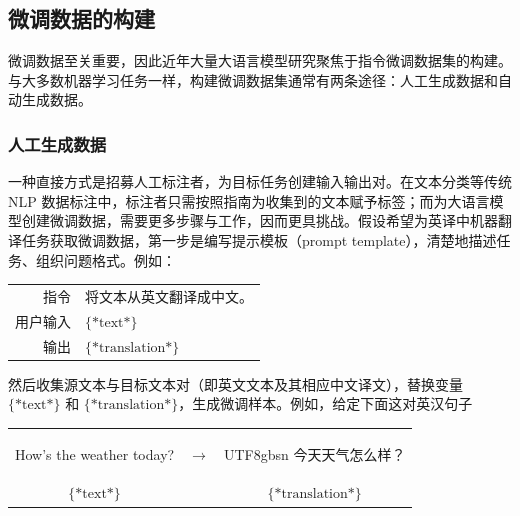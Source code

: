 \subsection{微调数据的构建}

\noindent 微调数据至关重要，因此近年大量大语言模型研究聚焦于指令微调数据集的构建。与大多数机器学习任务一样，构建微调数据集通常有两条途径：人工生成数据和自动生成数据。

\subsubsection{人工生成数据}

\noindent 一种直接方式是招募人工标注者，为目标任务创建输入输出对。在文本分类等传统 NLP 数据标注中，标注者只需按照指南为收集到的文本赋予标签；而为大语言模型创建微调数据，需要更多步骤与工作，因而更具挑战。假设希望为英译中机器翻译任务获取微调数据，第一步是编写提示模板（prompt template），清楚地描述任务、组织问题格式。例如：

\vspace{0.5em}
\begin{tcolorbox}

\begingroup
\renewcommand{\arraystretch}{1.0}
\setlength{\tabcolsep}{6pt}
\begin{tabular}{r l}
{\color{gray} \small{指令}} & 将文本从英文翻译成中文。 \\ [0.2cm]
{\color{gray} \small{用户输入}} & $\{*\mathrm{text}*\}$  \\ [0.2cm]
{\color{gray} \small{输出}} & \underline{$\{*\mathrm{translation}*\}$}
\end{tabular}
\endgroup

\end{tcolorbox}
\vspace{0.5em}

然后收集源文本与目标文本对（即英文文本及其相应中文译文），替换变量 $\{*\mathrm{text}*\}$ 和 $\{*\mathrm{translation}*\}$，生成微调样本。例如，给定下面这对英汉句子

\begin{center}
\begin{tabular}{r c l}
How's the weather today? & $\to$ & \begin{CJK*}{UTF8}{gbsn} 今天天气怎么样？ \end{CJK*} \\
\multicolumn{1}{c}{$\{*\mathrm{text}*\}$} & & \multicolumn{1}{c}{$\{*\mathrm{translation}*\}$}
\end{tabular}
\end{center}

